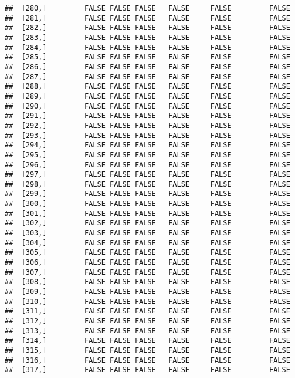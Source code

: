 \documentclass[
]{article}
\begin{document}
\begin{verbatim}
##  [280,]         FALSE FALSE FALSE   FALSE     FALSE         FALSE
##  [281,]         FALSE FALSE FALSE   FALSE     FALSE         FALSE
##  [282,]         FALSE FALSE FALSE   FALSE     FALSE         FALSE
##  [283,]         FALSE FALSE FALSE   FALSE     FALSE         FALSE
##  [284,]         FALSE FALSE FALSE   FALSE     FALSE         FALSE
##  [285,]         FALSE FALSE FALSE   FALSE     FALSE         FALSE
##  [286,]         FALSE FALSE FALSE   FALSE     FALSE         FALSE
##  [287,]         FALSE FALSE FALSE   FALSE     FALSE         FALSE
##  [288,]         FALSE FALSE FALSE   FALSE     FALSE         FALSE
##  [289,]         FALSE FALSE FALSE   FALSE     FALSE         FALSE
##  [290,]         FALSE FALSE FALSE   FALSE     FALSE         FALSE
##  [291,]         FALSE FALSE FALSE   FALSE     FALSE         FALSE
##  [292,]         FALSE FALSE FALSE   FALSE     FALSE         FALSE
##  [293,]         FALSE FALSE FALSE   FALSE     FALSE         FALSE
##  [294,]         FALSE FALSE FALSE   FALSE     FALSE         FALSE
##  [295,]         FALSE FALSE FALSE   FALSE     FALSE         FALSE
##  [296,]         FALSE FALSE FALSE   FALSE     FALSE         FALSE
##  [297,]         FALSE FALSE FALSE   FALSE     FALSE         FALSE
##  [298,]         FALSE FALSE FALSE   FALSE     FALSE         FALSE
##  [299,]         FALSE FALSE FALSE   FALSE     FALSE         FALSE
##  [300,]         FALSE FALSE FALSE   FALSE     FALSE         FALSE
##  [301,]         FALSE FALSE FALSE   FALSE     FALSE         FALSE
##  [302,]         FALSE FALSE FALSE   FALSE     FALSE         FALSE
##  [303,]         FALSE FALSE FALSE   FALSE     FALSE         FALSE
##  [304,]         FALSE FALSE FALSE   FALSE     FALSE         FALSE
##  [305,]         FALSE FALSE FALSE   FALSE     FALSE         FALSE
##  [306,]         FALSE FALSE FALSE   FALSE     FALSE         FALSE
##  [307,]         FALSE FALSE FALSE   FALSE     FALSE         FALSE
##  [308,]         FALSE FALSE FALSE   FALSE     FALSE         FALSE
##  [309,]         FALSE FALSE FALSE   FALSE     FALSE         FALSE
##  [310,]         FALSE FALSE FALSE   FALSE     FALSE         FALSE
##  [311,]         FALSE FALSE FALSE   FALSE     FALSE         FALSE
##  [312,]         FALSE FALSE FALSE   FALSE     FALSE         FALSE
##  [313,]         FALSE FALSE FALSE   FALSE     FALSE         FALSE
##  [314,]         FALSE FALSE FALSE   FALSE     FALSE         FALSE
##  [315,]         FALSE FALSE FALSE   FALSE     FALSE         FALSE
##  [316,]         FALSE FALSE FALSE   FALSE     FALSE         FALSE
##  [317,]         FALSE FALSE FALSE   FALSE     FALSE         FALSE

\end{verbatim}
\end{document}
